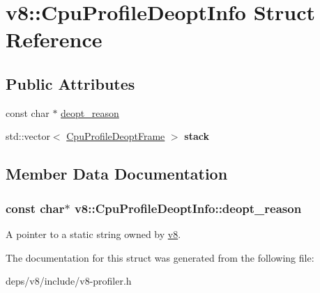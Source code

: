 \hypertarget{structv8_1_1_cpu_profile_deopt_info}{}\section{v8\+:\+:Cpu\+Profile\+Deopt\+Info Struct Reference}
\label{structv8_1_1_cpu_profile_deopt_info}
\subsection*{Public Attributes}
\begin{DoxyCompactItemize}
\item 
const char $\ast$ \hyperlink{structv8_1_1_cpu_profile_deopt_info_a908eb3ba33b47ace8973eeb2fda96ca9}{deopt\+\_\+reason}
\item 
\hypertarget{structv8_1_1_cpu_profile_deopt_info_a9446493c0e0a00e3ada02ba8df858d42}{}std\+::vector$<$ \hyperlink{structv8_1_1_cpu_profile_deopt_frame}{Cpu\+Profile\+Deopt\+Frame} $>$ {\bfseries stack}\label{structv8_1_1_cpu_profile_deopt_info_a9446493c0e0a00e3ada02ba8df858d42}

\end{DoxyCompactItemize}


\subsection{Member Data Documentation}
\hypertarget{structv8_1_1_cpu_profile_deopt_info_a908eb3ba33b47ace8973eeb2fda96ca9}{}
\subsubsection[{deopt\+\_\+reason}]{\setlength{\rightskip}{0pt plus 5cm}const char$\ast$ v8\+::\+Cpu\+Profile\+Deopt\+Info\+::deopt\+\_\+reason}\label{structv8_1_1_cpu_profile_deopt_info_a908eb3ba33b47ace8973eeb2fda96ca9}
A pointer to a static string owned by \hyperlink{namespacev8}{v8}. 

The documentation for this struct was generated from the following file\+:\begin{DoxyCompactItemize}
\item 
deps/v8/include/v8-\/profiler.\+h\end{DoxyCompactItemize}
